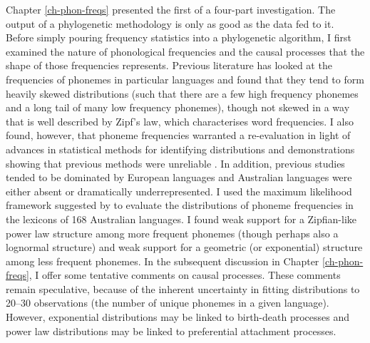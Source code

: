 Chapter \ref{ch-phon-freqs} presented the first of a four-part investigation. The output of a phylogenetic methodology is only as good as the data fed to it. Before simply pouring frequency statistics into a phylogenetic algorithm, I first examined the nature of phonological frequencies and the causal processes that the shape of those frequencies represents. Previous literature has looked at the frequencies of phonemes in particular languages and found that they tend to form heavily skewed distributions (such that there are a few high frequency phonemes and a long tail of many low frequency phonemes), though not skewed in a way that is well described by Zipf's law, which characterises word frequencies. I also found, however, that phoneme frequencies warranted a re-evaluation in light of advances in statistical methods for identifying distributions and demonstrations showing that previous methods were unreliable \autocite{clauset_power-law_2009}. In addition, previous studies tended to be dominated by European languages and Australian languages were either absent or dramatically underrepresented. I used the maximum likelihood framework suggested by \textcite{clauset_power-law_2009} to evaluate the distributions of phoneme frequencies in the lexicons of 168 Australian languages. I found weak support for a Zipfian-like power law structure among more frequent phonemes (though perhaps also a lognormal structure) and weak support for a geometric (or exponential) structure among less frequent phonemes. In the subsequent discussion in Chapter \ref{ch-phon-freqs}, I offer some tentative comments on causal processes. These comments remain speculative, because of the inherent uncertainty in fitting distributions to 20--30 observations (the number of unique phonemes in a given language). However, exponential distributions may be linked to birth-death processes and power law distributions may be linked to preferential attachment processes.

